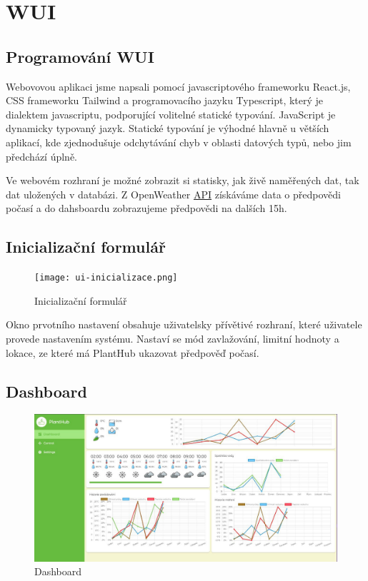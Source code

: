 \documentclass[czech,12pt,a4paper]{article}
\begin{document}
\clearpage

\section{WUI} \label{secWUI}

\subsection{Programování WUI}

Webovovou aplikaci jsme napsali pomocí javascriptového frameworku
React.js, CSS frameworku Tailwind a programovacího jazyku Typescript, který je dialektem javascriptu, podporující volitelné statické typování. JavaScript je dynamicky typovaný jazyk. Statické typování je výhodné hlavně u větších aplikací, kde zjednodušuje odchytávání chyb v oblasti datových typů, nebo jim předchází úplně.

Ve webovém rozhraní je možné zobrazit si statisky, jak živě naměřených dat, tak dat uložených v databázi. Z OpenWeather \underline{\ac{API}} získáváme data o předpovědi počasí a do dahsboardu zobrazujeme předpovědi na dalších 15h.

\subsection{Inicializační formulář}

\begin{figure}[h]
	\centering
	\texttt{[image: ui-inicializace.png]}
	\caption{Inicializační formulář}
\end{figure}

Okno prvotního nastavení obsahuje uživatelsky přívětivé rozhraní, které uživatele provede nastavením systému. Nastaví se mód zavlažování, limitní hodnoty a lokace, ze které má PlantHub ukazovat předpověď počasí.

\clearpage

\subsection{Dashboard}

\begin{figure}[h]
	\centering
	\includegraphics[width=\linewidth]{web-ui.png}
	\caption{Dashboard}
\end{figure}
\end{document}
